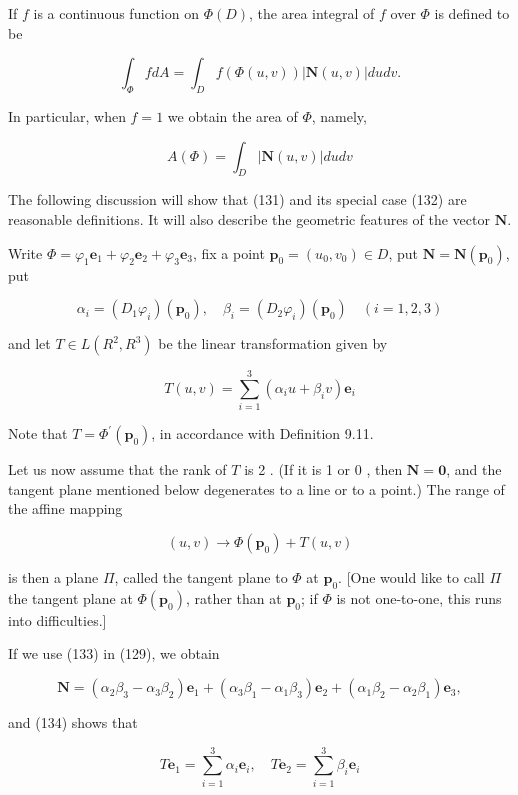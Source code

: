 \documentclass[10pt]{article}
\begin{document}
If $f$ is a continuous function on $\Phi(D)$, the area integral of $f$ over $\Phi$ is defined to be

$$
\int_{\Phi} f d A=\int_{D} f(\Phi(u, v))|\mathbf{N}(u, v)| d u d v .
$$

In particular, when $f=1$ we obtain the area of $\Phi$, namely,

$$
A(\Phi)=\int_{D}|\mathbf{N}(u, v)| d u d v
$$

The following discussion will show that (131) and its special case (132) are reasonable definitions. It will also describe the geometric features of the vector $\mathbf{N}$.

Write $\Phi=\varphi_{1} \mathbf{e}_{1}+\varphi_{2} \mathbf{e}_{2}+\varphi_{3} \mathbf{e}_{3}$, fix a point $\mathbf{p}_{0}=\left(u_{0}, v_{0}\right) \in D$, put $\mathbf{N}=\mathbf{N}\left(\mathbf{p}_{0}\right)$, put

$$
\alpha_{i}=\left(D_{1} \varphi_{i}\right)\left(\mathbf{p}_{0}\right), \quad \beta_{i}=\left(D_{2} \varphi_{i}\right)\left(\mathbf{p}_{0}\right) \quad(i=1,2,3)
$$

and let $T \in L\left(R^{2}, R^{3}\right)$ be the linear transformation given by

$$
T(u, v)=\sum_{i=1}^{3}\left(\alpha_{i} u+\beta_{i} v\right) \mathbf{e}_{i}
$$

Note that $T=\Phi^{\prime}\left(\mathbf{p}_{0}\right)$, in accordance with Definition 9.11.

Let us now assume that the rank of $T$ is 2 . (If it is 1 or 0 , then $\mathbf{N}=\mathbf{0}$, and the tangent plane mentioned below degenerates to a line or to a point.) The range of the affine mapping

$$
(u, v) \rightarrow \Phi\left(\mathbf{p}_{0}\right)+T(u, v)
$$

is then a plane $\Pi$, called the tangent plane to $\Phi$ at $\mathbf{p}_{0}$. [One would like to call $\Pi$ the tangent plane at $\Phi\left(\mathbf{p}_{0}\right)$, rather than at $\mathbf{p}_{0}$; if $\Phi$ is not one-to-one, this runs into difficulties.]

If we use (133) in (129), we obtain

$$
\mathbf{N}=\left(\alpha_{2} \beta_{3}-\alpha_{3} \beta_{2}\right) \mathbf{e}_{1}+\left(\alpha_{3} \beta_{1}-\alpha_{1} \beta_{3}\right) \mathbf{e}_{2}+\left(\alpha_{1} \beta_{2}-\alpha_{2} \beta_{1}\right) \mathbf{e}_{3},
$$

and (134) shows that

$$
T \mathbf{e}_{1}=\sum_{i=1}^{3} \alpha_{i} \mathbf{e}_{i}, \quad T \mathbf{e}_{2}=\sum_{i=1}^{3} \beta_{i} \mathbf{e}_{i}
$$
\end{document}
